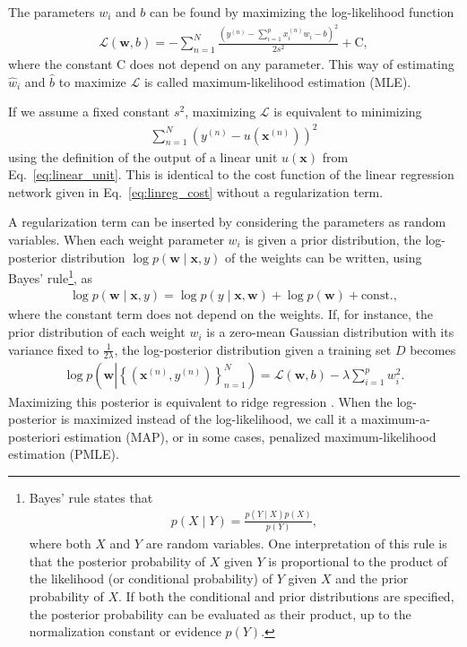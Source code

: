 \documentclass[dissertation,nocontribution]{aaltoseries}
\newcommand{\vect}[1]{\mathbf{#1}}
\newcommand{\vx}[0]{\vect{x}}
\newcommand{\vw}[0]{\vect{w}}
\newcommand{\LL}[0]{\mathcal{L}}
\begin{document}
The parameters $w_i$ and $b$ can be found by maximizing
the log-likelihood function
\begin{align}
    \label{eq:linreg_ll}
    \LL(\vw, b) = -\sum_{n=1}^N \frac{\left( y^{(n)} -
    \sum_{i=1}^p x_i^{(n)} w_i - b \right)^2}{2 s^2} +
    \text{C},
\end{align}
where the constant $\text{C}$ does not depend on any parameter.
This way of estimating $\hat{w}_i$ and $\hat{b}$ to
maximize $\LL$ is called maximum-likelihood estimation
(MLE).

If we assume a fixed constant $s^2$, maximizing $\LL$ is
equivalent to minimizing
\begin{align*}
    \sum_{n=1}^N \left( y^{(n)} -
    u(\vx^{(n)})\right)^2
\end{align*}
using the definition of the output of a linear unit $u(\vx)$
from Eq.~\eqref{eq:linear_unit}. This is identical to the
cost function of the linear regression network given in
Eq.~\eqref{eq:linreg_cost} without a regularization term. 

A regularization term can be inserted by considering the
parameters as random variables. When each weight parameter
$w_i$ is given a prior distribution, the log-posterior
distribution $\log p(\vw \mid \vx, y)$ of the weights can be
written, using Bayes' rule\footnote{Bayes' rule states
that
\begin{align}
    \label{eq:bayes_rule}
    p(X \mid Y) = \frac{p(Y \mid X) p(X)}{p(Y)},
\end{align}
where both $X$ and $Y$ are random variables. One
interpretation of this rule is that the posterior
probability of $X$ given $Y$ is proportional to the product
of the likelihood (or conditional probability) of $Y$ given
$X$ and the prior probability of $X$. 
If both the
conditional and prior distributions are specified, the
posterior probability can be evaluated as their product, up
to the normalization constant or evidence $p(Y)$.}, as
\begin{align*}
    \log p(\vw \mid \vx, y) = \log p(y \mid \vx, \vw) + \log
    p(\vw) + \text{const.},
\end{align*}
where the constant term does not depend on the weights. If,
for instance, the prior distribution of each weight $w_i$ is
a zero-mean Gaussian distribution with its variance fixed to
$\tfrac{1}{2\lambda}$, the log-posterior distribution given
a training set $D$ becomes
\begin{align*}
    \log p\left(\vw \left| \left\{ (\vx^{(n)}, y^{(n)})
    \right\}_{n=1}^N \right. \right) = \LL(\vw, b) - \lambda
    \sum_{i=1}^p w_i^2.
\end{align*}
Maximizing this posterior is equivalent to ridge regression
\citep{Hoerl1970}. When the log-posterior is maximized
instead of the log-likelihood, we call it a
maximum-a-posteriori estimation
(MAP), or
in some cases, penalized maximum-likelihood estimation
(PMLE).
\end{document}
